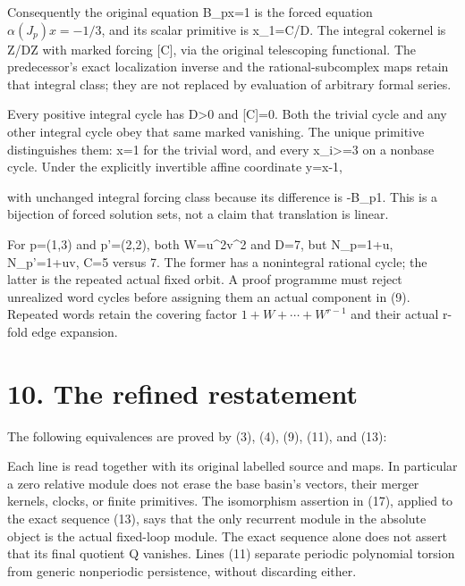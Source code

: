 Consequently the original equation B\_px=1 is the forced equation
\(\alpha(J_p)x=-1/3\), and its scalar primitive is x\_1=C/D. The
integral cokernel is Z/DZ with marked forcing {[}C{]}, via the original
telescoping functional. The predecessor's exact localization inverse and
the rational-subcomplex maps retain that integral class; they are not
replaced by evaluation of arbitrary formal series.

Every positive integral cycle has D\textgreater0 and {[}C{]}=0. Both the
trivial cycle and any other integral cycle obey that same marked
vanishing. The unique primitive distinguishes them: x=1 for the trivial
word, and every x\_i\textgreater=3 on a nonbase cycle. Under the
explicitly invertible affine coordinate y=x-1,


with unchanged integral forcing class because its difference is -B\_p1.
This is a bijection of forced solution sets, not a claim that
translation is linear.

For p=(1,3) and p'=(2,2), both W=u\^{}2v\^{}2 and D=7, but N\_p=1+u,
N\_p'=1+uv, C=5 versus 7. The former has a nonintegral rational cycle;
the latter is the repeated actual fixed orbit. A proof programme must
reject unrealized word cycles before assigning them an actual component
in (9). Repeated words retain the covering factor \(1+W+\cdots+W^{r-1}\)
and their actual r-fold edge expansion.

\section{10. The refined restatement}

The following equivalences are proved by (3), (4), (9), (11), and (13):


Each line is read together with its original labelled source and maps.
In particular a zero relative module does not erase the base basin's
vectors, their merger kernels, clocks, or finite primitives. The
isomorphism assertion in (17), applied to the exact sequence (13), says
that the only recurrent module in the absolute object is the actual
fixed-loop module. The exact sequence alone does not assert that its
final quotient Q vanishes. Lines (11) separate periodic polynomial
torsion from generic nonperiodic persistence, without discarding either.

